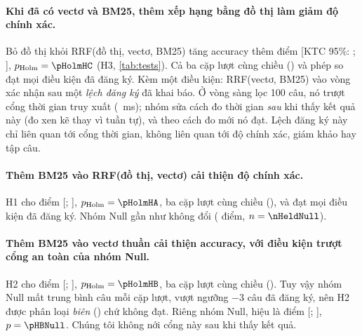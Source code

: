 \begin{table}[t]\centering
\caption{Kiểm định ghép cặp trên \nHeld{} câu ngoài dev. $\Delta$acc là hiệu accuracy trung bình theo câu (điểm phần trăm); KTC 95\% bootstrap ghép cặp; $p$ từ hoán vị đổi dấu (100.000 lần, $p$ nhỏ nhất đo được là $10^{-5}$), hiệu chỉnh Holm trong từng họ. ``Lên/xuống'': số câu sai$\to$đúng / đúng$\to$sai của từng cặp lượt sinh. ``Null net'': số câu Null đổi trung bình mỗi cặp lượt (âm là kém đi).}
\label{tab:tests}
\footnotesize
\resizebox{\linewidth}{!}{}
\end{table}

\paragraph{Khi đã có vectơ và BM25, thêm xếp hạng bằng đồ thị làm giảm độ chính xác.}
Bỏ đồ thị khỏi RRF(đồ thị, vectơ, BM25) tăng accuracy thêm \diffHC{} điểm [KTC 95\%: \ciLoHC; \ciHiHC], $p_{\text{Holm}} = \pHolmHC$ (H3, \cref{tab:tests}).
Cả ba cặp lượt cùng chiều (\pairsHC) và phép so đạt mọi điều kiện đã đăng ký.
Kèm một điều kiện: RRF(vectơ, BM25) vào vòng xác nhận sau một \emph{lệch đăng ký} đã khai báo. Ở vòng sàng lọc 100 câu, nó trượt cổng thời gian truy xuất (\timeGateFail~ms); nhóm sửa cách đo thời gian \emph{sau} khi thấy kết quả này (đo xen kẽ thay vì tuần tự), và theo cách đo mới nó đạt.
Lệch đăng ký này chỉ liên quan tới cổng thời gian, không liên quan tới độ chính xác, giám khảo hay tập câu.

\paragraph{Thêm BM25 vào RRF(đồ thị, vectơ) cải thiện độ chính xác.}
H1 cho \diffHA{} điểm [\ciLoHA; \ciHiHA], $p_{\text{Holm}} = \pHolmHA$, ba cặp lượt cùng chiều (\pairsHA), và đạt mọi điều kiện đã đăng ký.
Nhóm Null gần như không đổi (\diffHANull{} điểm, $n=\nHeldNull$).

\paragraph{Thêm BM25 vào vectơ thuần cải thiện accuracy, với điều kiện trượt cổng an toàn của nhóm Null.}
H2 cho \diffHB{} điểm [\ciLoHB; \ciHiHB], $p_{\text{Holm}} = \pHolmHB$, ba cặp lượt cùng chiều (\pairsHB).
Tuy vậy nhóm Null mất trung bình \nullNetHB{} câu mỗi cặp lượt, vượt ngưỡng $-3$ câu đã đăng ký, nên H2 được phân loại \emph{biên} (\classHB) chứ không đạt.
Riêng nhóm Null, hiệu là \diffHBNull{} điểm [\ciLoHBNull; \ciHiHBNull], $p = \pHBNull$.
Chúng tôi không nới cổng này sau khi thấy kết quả.

